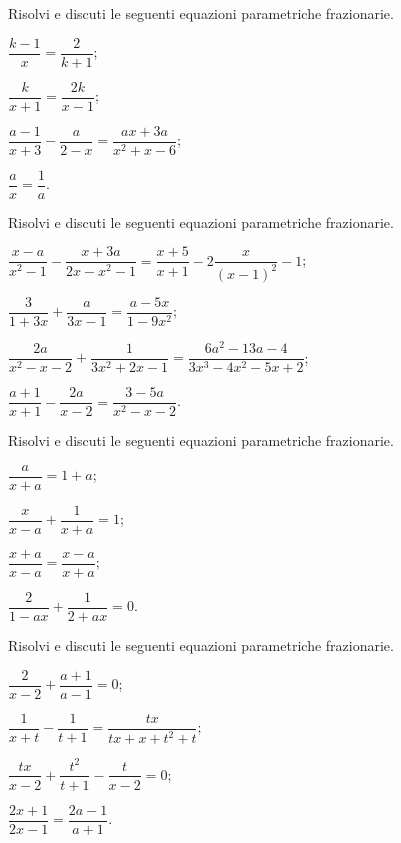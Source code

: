 \begin{esercizio}[\Ast]
\label{ese:19.16}
Risolvi e discuti le seguenti equazioni parametriche frazionarie.
\begin{multicols}{2}
\begin{enumeratea}
 \item $\dfrac{k-1}{x}=\dfrac{2}{k+1}$;
 \item $\dfrac{k}{x+1}=\dfrac{2k}{x-1}$;
 \item $\dfrac{a-1}{x+3}-\dfrac{a}{2-x}=\dfrac{ax+3a}{x^{2}+x-6}$;
 \item $\dfrac{a}{x}=\dfrac{1}{a}$.
\end{enumeratea}
\end{multicols}
\end{esercizio}

\begin{esercizio}[\Ast]
\label{ese:19.17}
Risolvi e discuti le seguenti equazioni parametriche frazionarie.
\begin{enumeratea}
 \item $\dfrac{x-a}{x^{2}-1}-\dfrac{x+3a}{2x-x^{2}-1}=\dfrac{x+5}{x+1}-2\dfrac{x}{(x-1)^{2}}-1$;
 \item $\dfrac{3}{1+3x}+\dfrac{a}{3x-1}=\dfrac{a-5x}{1-9x^{2}}$;
 \item $\dfrac{2a}{x^{2}-x-2}+\dfrac{1}{3x^{2}+2x-1}=\dfrac{6a^{2}-13a-4}{3x^{3}-4x^{2}-5x+2}$;
 \item $\dfrac{a+1}{x+1}-\dfrac{2a}{x-2}=\dfrac{3-5a}{x^{2}-x-2}$.
\end{enumeratea}
\end{esercizio}

\begin{esercizio}[\Ast]
\label{ese:19.18}
Risolvi e discuti le seguenti equazioni parametriche frazionarie.
\begin{multicols}{2}
\begin{enumeratea}
 \item $\dfrac{a}{x+a}=1+a$;
 \item $\dfrac{x}{x-a}+\dfrac{1}{x+a}=1$;
 \item $\dfrac{x+a}{x-a}=\dfrac{x-a}{x+a}$;
 \item $\dfrac{2}{1-ax}+\dfrac{1}{2+ax}=0$.
\end{enumeratea}
\end{multicols}
\end{esercizio}

\begin{esercizio}[\Ast]
\label{ese:19.19}
Risolvi e discuti le seguenti equazioni parametriche frazionarie.
\begin{multicols}{2}
\begin{enumeratea}
 \item $\dfrac{2}{x-2}+\dfrac{a+1}{a-1}=0$;
 \item $\dfrac{1}{x+t}-\dfrac{1}{t+1}=\dfrac{tx}{tx+x+t^{2}+t}$;
 \item $\dfrac{tx}{x-2}+\dfrac{t^{2}}{t+1}-\dfrac{t}{x-2}=0$;
 \item $\dfrac{2x+1}{2x-1}=\dfrac{2a-1}{a+1}$.
\end{enumeratea}
\end{multicols}
\end{esercizio}

